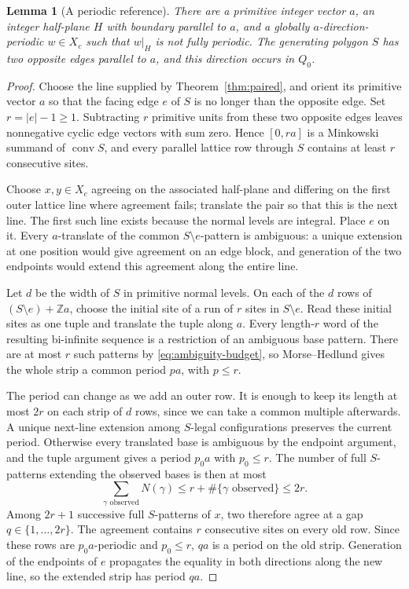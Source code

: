 \documentclass[11pt]{article}
\numberwithin{equation}{section}
\newtheorem{lemma}[theorem]{Lemma}
\theoremstyle{definition}
\theoremstyle{remark}
\newcommand{\Z}{\mathbb Z}
\newcommand{\conv}{\operatorname{conv}}
\begin{document}
\begin{lemma}[A periodic reference]\label{lem:reference}
There are a primitive integer vector $a$, an integer half-plane $H$ with boundary parallel to $a$,
and a globally $a$-direction-periodic $w\in X_c$ such that $w|_H$ is not fully periodic. The
generating polygon $S$ has two opposite edges parallel to $a$, and this direction occurs in $Q_0$.
\end{lemma}
\begin{proof}
Choose the line supplied by Theorem~\ref{thm:paired}, and orient its primitive vector $a$ so that
the facing edge $e$ of $S$ is no longer than the opposite edge. Set $r=|e|-1\ge1$. Subtracting $r$
primitive units from these two opposite edges leaves nonnegative cyclic edge vectors with sum zero.
Hence $[0,ra]$ is a Minkowski summand of $\conv S$, and every parallel lattice row through $S$
contains at least $r$ consecutive sites.

Choose $x,y\in X_c$ agreeing on the associated half-plane and differing on the first outer lattice
line where agreement fails; translate the pair so that this is the next line. The first such line
exists because the normal levels are integral. Place $e$ on it. Every $a$-translate of the common
$S\setminus e$-pattern is ambiguous: a unique extension at one position would give agreement on an
edge block, and generation of the two endpoints would extend this agreement along the entire line.

Let $d$ be the width of $S$ in primitive normal levels. On each of the $d$ rows of $(S\setminus
e)+\Z a$, choose the initial site of a run of $r$ sites in $S\setminus e$. Read these initial sites
as one tuple and translate the tuple along $a$. Every length-$r$ word of the resulting bi-infinite
sequence is a restriction of an ambiguous base pattern. There are at most $r$ such patterns by
\eqref{eq:ambiguity-budget}, so Morse--Hedlund gives the whole strip a common period $pa$, with
$p\le r$.

The period can change as we add an outer row. It is enough to keep its length at most $2r$ on each
strip of $d$ rows, since we can take a common multiple afterwards. A unique next-line extension
among $S$-legal configurations preserves the current period. Otherwise every translated base is
ambiguous by the endpoint argument, and the tuple argument gives a period $p_0a$ with $p_0\le r$.
The number of full $S$-patterns extending the observed bases is then at most
\[
 \sum_{\gamma\text{ observed}}N(\gamma)
 \le r+\#\{\gamma\text{ observed}\}\le2r.
\]
Among $2r+1$ successive full $S$-patterns of $x$, two therefore agree at a gap
$q\in\{1,\ldots,2r\}$. The agreement contains $r$ consecutive sites on every old row. Since these
rows are $p_0a$-periodic and $p_0\le r$, $qa$ is a period on the old strip. Generation of the
endpoints of $e$ propagates the equality in both directions along the new line, so the extended
strip has period $qa$.


\end{proof}
\end{document}
